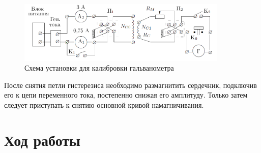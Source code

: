 \documentclass[a4paper]{article}
\begin{document}
\begin{figure}[h]
    \centering
    \includegraphics[width=10cm]{fig3.PNG}
    \caption{Схема установки для калибровки гальванометра}
    \label{fig:vac}
\end{figure}

После снятия петли гистерезиса необходимо размагнитить сердечник, подключив его к цепи переменного тока, постепенно снижая его амплитуду. Только затем следует приступать к снятию основной кривой намагничивания.

\section{Ход работы}
\end{document}
